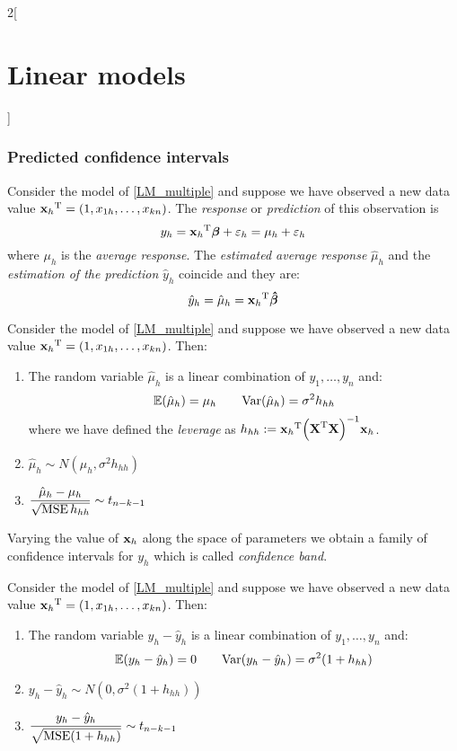 \documentclass[../../../main_math.tex]{subfiles}
\begin{document}
\begin{multicols}{2}[\section{Linear models}]
  \subsubsection{Predicted confidence intervals}
  \begin{definition}
    Consider the model of \cref{LM_multiple} and suppose we have observed a new data value ${\boldsymbol{\mathrm{x}}_h}^{\mathrm{T}}=(1,x_{1h},\ldots,x_{kn})$. The \emph{response} or \emph{prediction} of this observation is $$y_h={\boldsymbol{\mathrm{x}}_h}^{\mathrm{T}}\boldsymbol{\mathrm{\beta}}+\varepsilon_h=\mu_h+\varepsilon_h$$
    where $\mu_h$ is the \emph{average response}. The \emph{estimated average response} $\hat\mu_h$ and the \emph{estimation of the prediction} $\hat{y}_h$ coincide and they are: $$\hat{y}_h=\hat\mu_h={\boldsymbol{\mathrm{x}}_h}^{\mathrm{T}}\boldsymbol{\mathrm{\hat\beta}}$$
  \end{definition}
  \begin{proposition}
    Consider the model of \cref{LM_multiple} and suppose we have observed a new data value ${\boldsymbol{\mathrm{x}}_h}^{\mathrm{T}}=(1,x_{1h},\ldots,x_{kn})$. Then:
    \begin{enumerate}
      \item The random variable $\hat\mu_h$ is a linear combination of $y_1,\ldots,y_n$ and: $$\mathbb{E}(\hat\mu_h)=\mu_h\qquad\mathrm{Var}(\hat\mu_h)=\sigma^2h_{hh}$$ where we have defined the \emph{leverage} as $h_{hh}:={\boldsymbol{\mathrm{x}}_h}^{\mathrm{T}}{\left({\boldsymbol{\mathrm{X}}}^{\mathrm{T}}\boldsymbol{\mathrm{X}}\right)}^{-1}\boldsymbol{\mathrm{x}}_h$.
      \item $\hat\mu_h\sim N(\mu_h,\sigma^2h_{hh})$
      \item $\displaystyle\frac{\hat\mu_h-\mu_h}{\sqrt{\operatorname{MSE} h_{hh}}}\sim t_{n-k-1}$
    \end{enumerate}
    Varying the value of $\boldsymbol{\mathrm{x}}_h$ along the space of parameters we obtain a family of confidence intervals for $y_h$ which is called \emph{confidence band}.
  \end{proposition}
  \begin{proposition}
    Consider the model of \cref{LM_multiple} and suppose we have observed a new data value ${\boldsymbol{\mathrm{x}}_h}^{\mathrm{T}}=(1,x_{1h},\ldots,x_{kn})$. Then:
    \begin{enumerate}
      \item The random variable $y_h-\hat{y}_h$ is a linear combination of $y_1,\ldots,y_n$ and: $$\mathbb{E}(y_h-\hat{y}_h)=0\qquad\mathrm{Var}(y_h-\hat{y}_h)=\sigma^2(1+h_{hh})$$
      \item $y_h-\hat{y}_h\sim N(0,\sigma^2(1+h_{hh}))$
      \item $\displaystyle\frac{y_h-\hat{y}_h}{\sqrt{\operatorname{MSE} (1+h_{hh})}}\sim t_{n-k-1}$

\end{enumerate}
\end{proposition}
\end{multicols}
\end{document}
